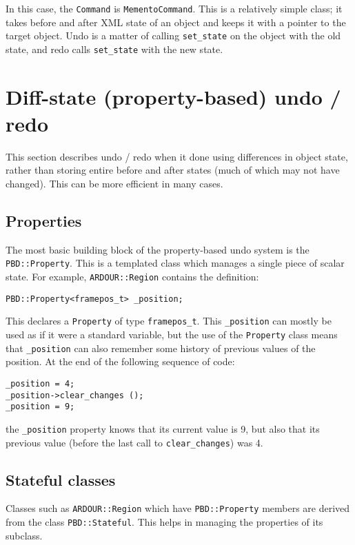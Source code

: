 \documentclass[10pt,a4paper]{book}
\newcommand{\code}[1]{\texttt{#1}}
\begin{document}
In this case, the \code{Command} is \code{MementoCommand}.  This is a
relatively simple class; it takes before and after XML state of an
object and keeps it with a pointer to the target object.  Undo is a
matter of calling \code{set\_state} on the object with the old state,
and redo calls \code{set\_state} with the new state.

\section{Diff-state (property-based) undo / redo}

This section describes undo / redo when it done using differences in
object state, rather than storing entire before and after states (much
of which may not have changed).  This can be more efficient in many
cases.


\subsection{Properties}

The most basic building block of the property-based undo system is the
\code{PBD::Property}.  This is a templated class which manages a
single piece of scalar state.  For example, \code{ARDOUR::Region}
contains the definition:

\begin{lstlisting}
PBD::Property<framepos_t> _position;
\end{lstlisting}

This declares a \code{Property} of type \code{framepos\_t}.  This
\code{\_position} can mostly be used as if it were a standard
variable, but the use of the \code{Property} class means that
\code{\_position} can also remember some history of previous values of
the position.  At the end of the following sequence of code:

\begin{lstlisting}
_position = 4;
_position->clear_changes ();
_position = 9;
\end{lstlisting}

the \code{\_position} property knows that its current value is 9, but
also that its previous value (before the last call to
\code{clear\_changes}) was 4.

\subsection{Stateful classes}

Classes such as \code{ARDOUR::Region} which have \code{PBD::Property}
members are derived from the class \code{PBD::Stateful}.  This helps
in managing the properties of its subclass.
\end{document}
